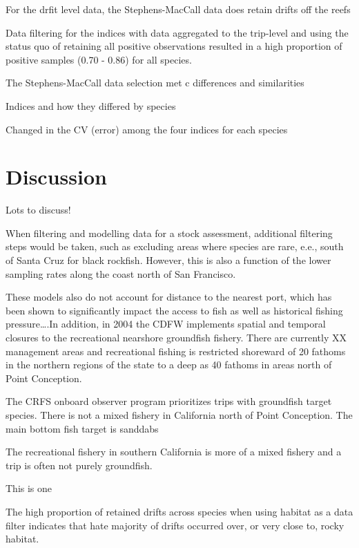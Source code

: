 \documentclass[
  authoryear,
  preprint,
  3p]{elsarticle}
\begin{document}
For the drfit level data, the Stephens-MacCall data does retain drifts
off the reefs

Data filtering for the indices with data aggregated to the trip-level
and using the status quo of retaining all positive observations resulted
in a high proportion of positive samples (0.70 - 0.86) for all species.

The Stephens-MacCall data selection met c differences and similarities

Indices and how they differed by species

Changed in the CV (error) among the four indices for each species

\FloatBarrier

\hypertarget{discussion}{%
\section{Discussion}\label{discussion}}

Lots to discuss!

When filtering and modelling data for a stock assessment, additional
filtering steps would be taken, such as excluding areas where species
are rare, e.e., south of Santa Cruz for black rockfish. However, this is
also a function of the lower sampling rates along the coast north of San
Francisco.

These models also do not account for distance to the nearest port, which
has been shown to significantly impact the access to fish as well as
historical fishing pressure\ldots.In addition, in 2004 the CDFW
implements spatial and temporal closures to the recreational nearshore
groundfish fishery. There are currently XX management areas and
recreational fishing is restricted shoreward of 20 fathoms in the
northern regions of the state to a deep as 40 fathoms in areas north of
Point Conception.

The CRFS onboard observer program prioritizes trips with groundfish
target species. There is not a mixed fishery in California north of
Point Conception. The main bottom fish target is sanddabs

The recreational fishery in southern California is more of a mixed
fishery and a trip is often not purely groundfish.

This is one

The high proportion of retained drifts across species when using habitat
as a data filter indicates that hate majority of drifts occurred over,
or very close to, rocky habitat.
\end{document}
